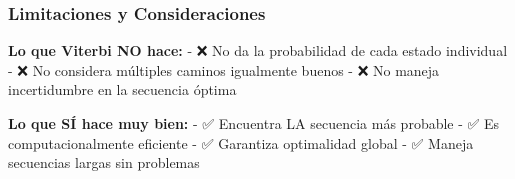 \documentclass[
]{article}
\begin{document}
\subsubsection{Limitaciones y
Consideraciones}\label{limitaciones-y-consideraciones}

\textbf{Lo que Viterbi NO hace:} - ❌ No da la probabilidad de cada
estado individual - ❌ No considera múltiples caminos igualmente buenos
- ❌ No maneja incertidumbre en la secuencia óptima

\textbf{Lo que SÍ hace muy bien:} - ✅ Encuentra LA secuencia más
probable - ✅ Es computacionalmente eficiente - ✅ Garantiza optimalidad
global - ✅ Maneja secuencias largas sin problemas
\end{document}
